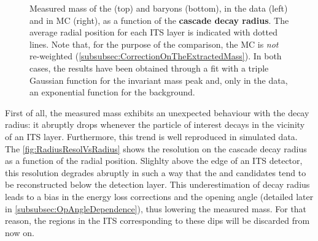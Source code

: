 \begin{figure}[h]
\hspace*{-2.cm}
\hspace*{-2.cm}
\caption{Measured mass of the \rmXi (top) and \rmOmega baryons (bottom), in the data (left) and in MC (right), as a function of the \textbf{cascade decay radius}. The average radial position for each ITS layer is indicated with dotted lines. Note that, for the purpose of the comparison, the MC is \textit{not} re-weighted (\Sec\ref{subsubsec:CorrectionOnTheExtractedMass}). In both cases, the results have been obtained through a fit with a triple Gaussian function for the invariant mass peak and, only in the data, an exponential function for the background.}
	\label{fig:MassVsRadius}
\end{figure}

First of all, the measured mass exhibits an unexpected behaviour with the decay radius: it abruptly drops whenever the particle of interest decays in the vicinity of an ITS layer. Furthermore, this trend is well reproduced in simulated data. The \fig\ref{fig:RadiusResolVsRadius} shows the resolution on the cascade decay radius as a function of the radial position. Slighlty above the edge of an ITS detector, this resolution degrades abruptly in such a way that the \rmXi and \rmOmega candidates tend to be reconstructed below the detection layer. This underestimation of decay radius leads to a bias in the energy loss corrections and the opening angle (detailed later in \Sec\ref{subsubsec:OpAngleDependence}), thus lowering the measured mass. For that reason, the regions in the ITS corresponding to these dips will be discarded from now on.\\

